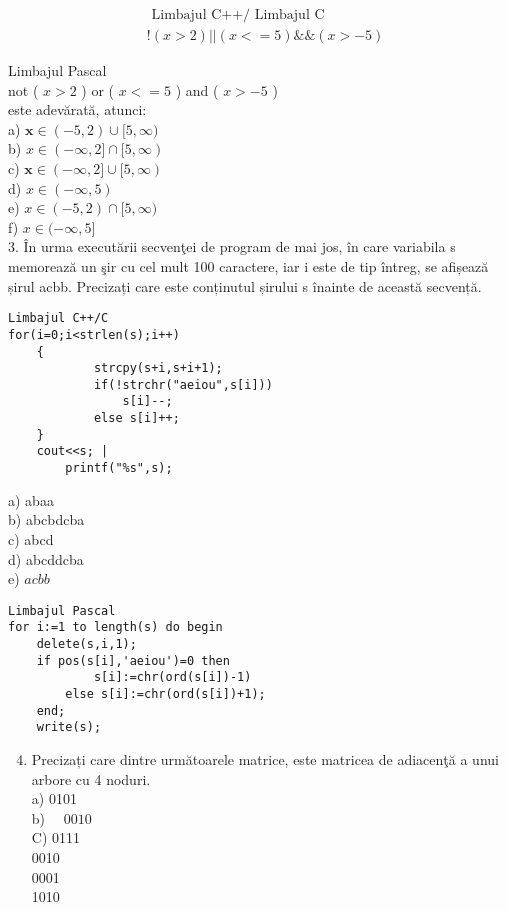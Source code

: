 $$
\begin{aligned}
& \text { Limbajul C++/ Limbajul C } \\
& !(x>2)| |(x<=5) \& \&(x>-5)
\end{aligned}
$$

Limbajul Pascal\\
not ( $x>2$ ) or ( $x<=5$ ) and ( $x>-5$ )\\
este adevărată, atunci:\\
a) $\mathbf{x} \in(-5,2) \cup[5, \infty)$\\
b) $x \in(-\infty, 2] \cap[5, \infty)$\\
c) $\mathbf{x} \in(-\infty, 2] \cup[5, \infty)$\\
d) $x \in(-\infty, 5)$\\
e) $x \in(-5,2) \cap[5, \infty)$\\
f) $x \in(-\infty, 5]$\\
3. În urma executării secvenţei de program de mai jos, în care variabila s memorează un şir cu cel mult 100 caractere, iar i este de tip întreg, se afișează șirul acbb. Precizați care este conținutul șirului s înainte de această secvență.

\begin{verbatim}
Limbajul C++/C
for(i=0;i<strlen(s);i++)
    {
            strcpy(s+i,s+i+1);
            if(!strchr("aeiou",s[i]))
                s[i]--;
            else s[i]++;
    }
    cout<<s; |
        printf("%s",s);
\end{verbatim}

a) abaa\\
b) abcbdcba\\
c) abcd\\
d) abcddcba\\
e) $a c b b$

\begin{verbatim}
Limbajul Pascal
for i:=1 to length(s) do begin
    delete(s,i,1);
    if pos(s[i],'aeiou')=0 then
            s[i]:=chr(ord(s[i])-1)
        else s[i]:=chr(ord(s[i])+1);
    end;
    write(s);
\end{verbatim}

\begin{enumerate}
  \setcounter{enumi}{3}
  \item Precizați care dintre următoarele matrice, este matricea de adiacenţă a unui arbore cu 4 noduri.\\
a) 0101\\
b) $\quad 0010$\\
C) 0111\\
0010\\
0001\\
1010
\end{enumerate}

